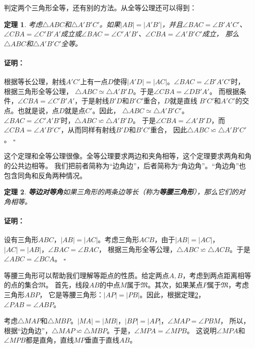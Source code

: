 \documentclass[12pt,UTF8]{ctexbook}
\newtheorem{tm}{定理}[section]
\newenvironment{proof2}{\paragraph{\textbf{证明：}}}{\hfill$\square$}
\begin{document}
判定两个三角形全等，还有别的方法。从全等公理还可以得到：
\begin{tm}\label{tm:3-0-0}
    考虑$\triangle ABC$和$\triangle A'B'C'$。如果$|AB| = |A'B'|$，并且$\angle BAC = \angle B'A'C'$、
    $\angle CBA = \angle C'B'A'$成立或$\angle BAC = \angle C'A'B'$、$\angle CBA = \angle A'B'C'$成立，
    那么$\triangle ABC$和$\triangle A'B'C'$全等。    
\end{tm}
\begin{proof2}
    根据等长公理，射线$A'C'$上有一点$D$使得$|A'D| = |AC|$。$\angle BAC = \angle B'A'C'$时，
    根据三角形全等公理，
    $\triangle ABC \simeq \triangle A'B'D$。于是$\angle CBA = \angle DB'A'$。
    而根据条件，$\angle CBA = \angle C'B'A'$，于是射线$B'D$和$B'C'$重合，$D$就是直线
    $B'C'$和$A'C'$的交点。也就是说，点$D$就是点$C'$。因此，
    $\triangle ABC \simeq \triangle A'B'C'$。\\
    $\angle BAC = \angle C'A'B'$时，$\triangle ABC \backsimeq \triangle A'B'D$。
    于是$\angle CBA = \angle A'B'D$，而$\angle CBA = \angle A'B'C'$，从而同样有射线$B'D$和$B'C'$重合，
    因此$\triangle ABC \backsimeq \triangle A'B'C'$。
\end{proof2}

这个定理和全等公理很像。全等公理要求两边和夹角相等，这个定理要求两角和角的公共边相等。
我们把前者简称为“边角边”，后者简称为“角边角”。“角边角”也包含同角和反角两种情况。

\begin{tm}{\textbf{等边对等角}}\label{tm:3-0-1}
    如果三角形的两条边等长（称为\textbf{等腰三角形}），那么它们的对角相等。
\end{tm}
\begin{proof2}
    设有三角形$ABC$，$|AB|=|AC|$。考虑三角形$ACB$，由于$|AB|=|AC|$，$|AC|=|AB|$，$\angle BAC = \angle BAC$，
    根据三角形全等公理，$\triangle ABC \backsimeq \triangle ACB$。于是$\angle ABC = \angle BCA$。
\end{proof2}

等腰三角形可以帮助我们理解等距点的性质。给定两点$A,B$，考虑到两点距离相等的点的集合$\mathfrak{M}$。
首先，线段$AB$的中点$M$属于$\mathfrak{M}$。其次，如果某点$P$属于$\mathfrak{M}$，考虑三角形$ABP$，
它是等腰三角形：$|AP|=|PB|$。因此，根据定理\ref{tm:3-0-1}，$\angle PAB = \angle ABP$。

考虑$\triangle MAP$和$\triangle MBP$。$|MA| = |MB|$，$|BP| = |AP|$，$\angle MAP = \angle PBM$，
所以，根据“边角边”，$\triangle MAP \backsimeq \triangle MBP$。于是，$\angle MPA = \angle MPB$。
这说明$\angle MPA$和$\angle MPB$都是直角，直线$MP$垂直于直线$AB$。
\end{document}
